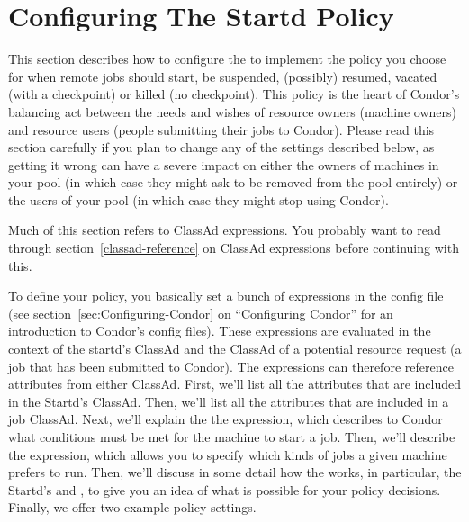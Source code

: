 \section{Configuring The Startd Policy}
\label{sec:Configuring-Policy}

This section describes how to configure the  to
implement the policy you choose for when remote jobs should start, be
suspended, (possibly) resumed, vacated (with a checkpoint) or killed
(no checkpoint).  This policy is the heart of Condor's balancing act
between the needs and wishes of resource owners (machine owners) and
resource users (people submitting their jobs to Condor).  Please read
this section carefully if you plan to change any of the settings
described below, as getting it wrong can have a severe impact on
either the owners of machines in your pool (in which case they might
ask to be removed from the pool entirely) or the users of your pool
(in which case they might stop using Condor).  

Much of this section refers to ClassAd expressions.  You probably want
to read through section~\ref{classad-reference} on ClassAd expressions before 
continuing with this. 

To define your policy, you basically set a bunch of expressions in the
config file (see section~\ref{sec:Configuring-Condor} on ``Configuring
Condor'' for an introduction to Condor's config files).  These
expressions are evaluated in the context of the startd's ClassAd and
the ClassAd of a potential resource request (a job that has been
submitted to Condor).  The expressions can therefore reference
attributes from either ClassAd.  First, we'll list all the attributes
that are included in the Startd's ClassAd.  Then, we'll list all the
attributes that are included in a job ClassAd.  Next, we'll explain
the the  expression, which describes to Condor what
conditions must be met for the machine to start a job.  Then, we'll
describe the  expression, which allows you to specify which
kinds of jobs a given machine prefers to run.  Then, we'll discuss in
some detail how the  works, in particular, the Startd's
 and , to give you an idea of what is
possible for your policy decisions.  Finally, we offer two example
policy settings.

